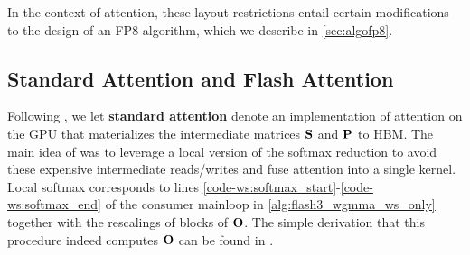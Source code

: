 In the context of attention, these layout restrictions entail certain modifications to the design of an FP8 algorithm, which we describe in \cref{sec:algofp8}.

\subsection{Standard Attention and Flash Attention}
Following \citet{dao2022flashattention}, we let \textbf{standard attention} denote an implementation of attention on the GPU that materializes the intermediate matrices $\mathbf{S}$ and $\mathbf{P}$ to HBM. The main idea of \fa was to leverage a local version of the softmax reduction to avoid these expensive intermediate reads/writes and fuse attention into a single kernel. Local softmax corresponds to lines \ref{code-ws:softmax_start}-\ref{code-ws:softmax_end} of the consumer mainloop in \cref{alg:flash3_wgmma_ws_only} together with the rescalings of blocks of $\mathbf{O}$. The simple derivation that this procedure indeed computes $\mathbf{O}$ can be found in \cite[\S 2.3.1]{dao2023flashattention2}.
